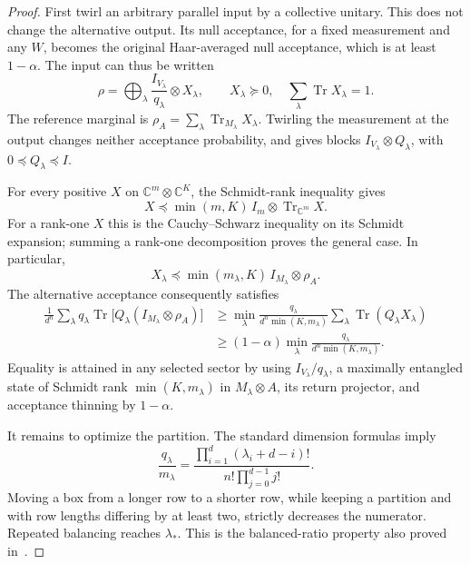 \documentclass[11pt,a4paper]{article}
\theoremstyle{remark}\newtheorem{remark}[theorem]{Remark}
\DeclareMathOperator{\Tr}{Tr}
\newcommand{\bbC}{\mathbb C}
\begin{document}
\begin{proof}
First twirl an arbitrary parallel input by a collective unitary. This does not change the alternative output. Its null acceptance, for a fixed measurement and any $W$, becomes the original Haar-averaged null acceptance, which is at least $1-\alpha$. The input can thus be written
\begin{equation}
 \rho=\bigoplus_\lambda \frac{I_{V_\lambda}}{q_\lambda}\otimes X_\lambda,
 \qquad X_\lambda\succeq0,\quad\sum_\lambda\Tr X_\lambda=1.
\end{equation}
The reference marginal is $\rho_A=\sum_\lambda\Tr_{M_\lambda}X_\lambda$. Twirling the measurement at the output changes neither acceptance probability, and gives blocks $I_{V_\lambda}\otimes Q_\lambda$, with $0\preceq Q_\lambda\preceq I$.

For every positive $X$ on $\bbC^m\otimes\bbC^K$, the Schmidt-rank inequality gives
\begin{equation}\label{eq:rankineq}
 X\preceq\min(m,K)\,I_m\otimes\Tr_{\bbC^m}X.
\end{equation}
For a rank-one $X$ this is the Cauchy--Schwarz inequality on its Schmidt expansion; summing a rank-one decomposition proves the general case. In particular,
\begin{equation}
 X_\lambda\preceq\min(m_\lambda,K)\,I_{M_\lambda}\otimes\rho_A.
\end{equation}
The alternative acceptance consequently satisfies
\begin{align}
 \frac1{d^n}\sum_\lambda q_\lambda
 \Tr\bigl[Q_\lambda(I_{M_\lambda}\otimes\rho_A)\bigr]
 &\geq\min_\lambda\frac{q_\lambda}{d^n\min(K,m_\lambda)}
 \sum_\lambda\Tr(Q_\lambda X_\lambda)\\
 &\geq(1-\alpha)\min_\lambda
 \frac{q_\lambda}{d^n\min(K,m_\lambda)}.
\end{align}
Equality is attained in any selected sector by using $I_{V_\lambda}/q_\lambda$, a maximally entangled state of Schmidt rank $\min(K,m_\lambda)$ in $M_\lambda\otimes A$, its return projector, and acceptance thinning by $1-\alpha$.

It remains to optimize the partition. The standard dimension formulas imply
\begin{equation}\label{eq:ratio}
 \frac{q_\lambda}{m_\lambda}
 =\frac{\prod_{i=1}^d(\lambda_i+d-i)!}
 {n!\prod_{j=0}^{d-1}j!}.
\end{equation}
Moving a box from a longer row to a shorter row, while keeping a partition and with row lengths differing by at least two, strictly decreases the numerator. Repeated balancing reaches $\lambda_*$. This is the balanced-ratio property also proved in~\cite[Appendix B]{chiribella}.


\end{proof}
\end{document}
